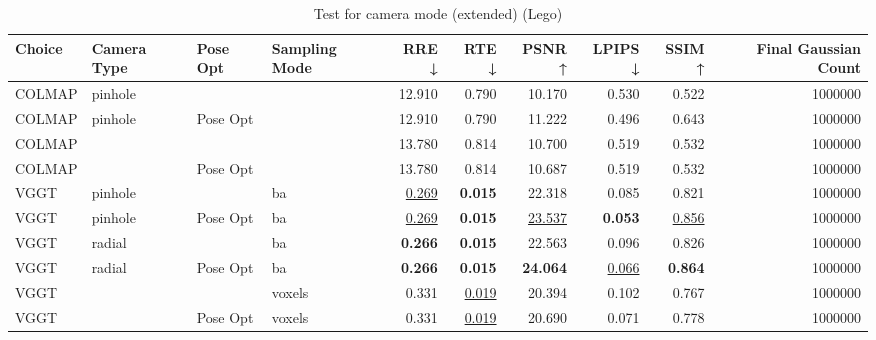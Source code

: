 \begin{table}[H]
\caption{Test for camera mode (extended) (Lego)}
\label{tab:10_camera_type_ext_lego}
\begin{tabular}{llllrrrrrr}
\toprule
Choice & Camera Type & Pose Opt & Sampling Mode & RRE ↓ & RTE ↓ & PSNR ↑ & LPIPS ↓ & SSIM ↑ & Final Gaussian Count \\
\midrule
COLMAP & pinhole &  &  & 12.910 & 0.790 & 10.170 & 0.530 & 0.522 & 1000000 \\
COLMAP & pinhole & Pose Opt &  & 12.910 & 0.790 & 11.222 & 0.496 & 0.643 & 1000000 \\
COLMAP &  &  &  & 13.780 & 0.814 & 10.700 & 0.519 & 0.532 & 1000000 \\
COLMAP &  & Pose Opt &  & 13.780 & 0.814 & 10.687 & 0.519 & 0.532 & 1000000 \\
VGGT & pinhole &  & ba & \underline{0.269} & \textbf{0.015} & 22.318 & 0.085 & 0.821 & 1000000 \\
VGGT & pinhole & Pose Opt & ba & \underline{0.269} & \textbf{0.015} & \underline{23.537} & \textbf{0.053} & \underline{0.856} & 1000000 \\
VGGT & radial &  & ba & \textbf{0.266} & \textbf{0.015} & 22.563 & 0.096 & 0.826 & 1000000 \\
VGGT & radial & Pose Opt & ba & \textbf{0.266} & \textbf{0.015} & \textbf{24.064} & \underline{0.066} & \textbf{0.864} & 1000000 \\
VGGT &  &  & voxels & 0.331 & \underline{0.019} & 20.394 & 0.102 & 0.767 & 1000000 \\
VGGT &  & Pose Opt & voxels & 0.331 & \underline{0.019} & 20.690 & 0.071 & 0.778 & 1000000 \\
\bottomrule
\end{tabular}
\end{table}
